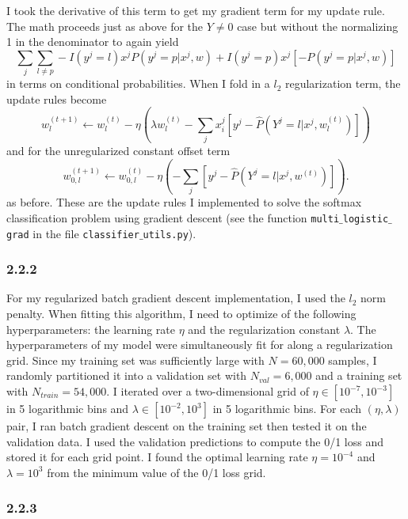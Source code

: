 \documentclass[12pt]{amsart}
\begin{document}
I took the derivative of this term to get my gradient term for my update rule.  The math proceeds just as above for the $Y \neq 0$ case but without the normalizing 1 in the denominator to again yield
\begin{equation}
\sum_j \sum_{l \neq p} -I(y^j = l) x^j P(y^j = p | x^j, w) + I(y^j = p) x^j \left[- P(y^j = p | x^j, w) \right]
\end{equation}
in terms on conditional probabilities.  When I fold in a $l_2$ regularization term, the update rules become
 \begin{equation}
w^{(t+1)}_l \leftarrow w^{(t)}_l - \eta (\lambda w^{(t)}_l - \sum_j x^j_i[y^j - \hat{P}(Y^j = l | x^j, w_l^{(t)})])
\end{equation}
and for the unregularized constant offset term
\begin{equation}
w^{(t+1)}_{0,l} \leftarrow w^{(t)}_{0,l} - \eta (- \sum_j[y^j - \hat{P}(Y^j = l | x^j, w^{(t)})]).
\end{equation}
as before.  These are the update rules I implemented to solve the softmax classification problem using gradient descent (see the function {\tt multi$\_$logistic$\_$grad} in the file {\tt classifier$\_$utils.py}).

\subsubsection*{2.2.2}

For my regularized batch gradient descent implementation, I used the $l_2$ norm penalty.  When fitting this algorithm, I need to optimize of the following hyperparameters: the learning rate $\eta$ and the regularization constant $\lambda$.  The hyperparameters of my model were simultaneously fit for along a regularization grid.  Since my training set was sufficiently large with $N = 60,000$ samples, I randomly partitioned it into a validation set with $N_{val} = 6,000$ and a training set with $N_{train} = 54,000$.  I iterated over a two-dimensional grid of $\eta \in [10^{-7},10^{-3}]$ in 5 logarithmic bins and $\lambda \in [10^{-2},10^{3}]$ in 5 logarithmic bins.  For each $(\eta,\lambda)$ pair, I ran batch gradient descent on the training set then tested it on the validation data.  I used the validation predictions to compute the 0/1 loss and stored it for each grid point.  I found the optimal learning rate $\eta = 10^{-4}$ and $\lambda = 10^3$ from the minimum value of the 0/1 loss grid.  

\subsubsection*{2.2.3}
\end{document}
